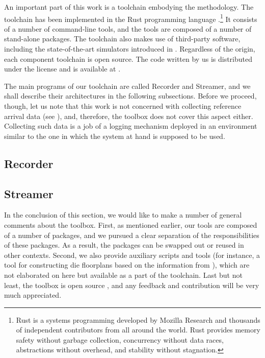 An important part of this work is a toolchain embodying the methodology. The
toolchain has been implemented in the Rust programming language
\cite{rust}.\footnote{Rust is a systems programming developed by Mozilla
Research and thousands of independent contributors from all around the world.
Rust provides memory safety without garbage collection, concurrency without data
races, abstractions without overhead, and stability without stagnation.} It
consists of a number of command-line tools, and the tools are composed of a
number of stand-alone packages. The toolchain also makes use of third-party
software, including the state-of-the-art simulators introduced in
. Regardless of the origin, each component toolchain is open
source. The code written by us is distributed under the  license
\cite{mit} and is available at \cite{sources}.

The main programs of our toolchain are called Recorder and Streamer, and we
shall describe their architectures in the following subsections. Before we
proceed, though, let us note that this work is not concerned with collecting
reference arrival data (see ), and, therefore, the toolbox does
not cover this aspect either. Collecting such data is a job of a logging
mechanism deployed in an environment similar to the one in which the system at
hand is supposed to be used.

\subsection{Recorder}


\subsection{Streamer}


In the conclusion of this section, we would like to make a number of general
comments about the toolbox. First, as mentioned earlier, our tools are composed
of a number of packages, and we pursued a clear separation of the
responsibilities of these packages. As a result, the packages can be swapped out
or reused in other contexts. Second, we also provide auxiliary scripts and tools
(for instance, a tool for constructing die floorplans based on the information
from ), which are not elaborated on here but available as a part of
the toolchain. Last but not least, the toolbox is open source \cite{sources},
and any feedback and contribution will be very much appreciated.
